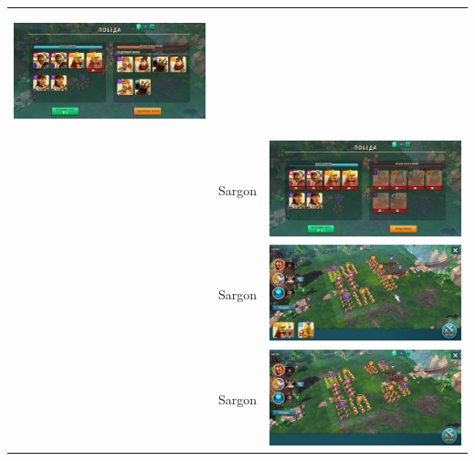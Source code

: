 \begin{longtable}{|c|c|c|}
	\hypertarget{fight34}{\includegraphics[width=0.75\linewidth]{./parts/media/TreasureHunt/34/sargon/photo_2022-04-07_10-08-16.jpg}} \\
	& Sargon &
	\includegraphics[width=0.75\linewidth]{./parts/media/TreasureHunt/34/sargon/photo_2022-04-07_10-08-23.jpg} \\
	& Sargon &
	\includegraphics[width=0.75\linewidth]{./parts/media/TreasureHunt/34/sargon/photo_2022-04-07_10-08-04.jpg} \\
	& Sargon &
	\includegraphics[width=0.75\linewidth]{./parts/media/TreasureHunt/34/sargon/photo_2022-04-07_10-08-19.jpg} \\

\end{longtable}
